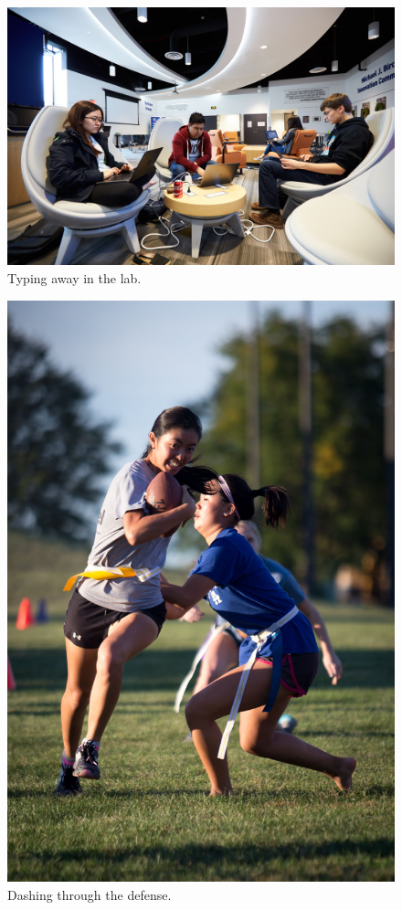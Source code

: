 \documentclass{report}
\begin{document}
\begin{figure}
  \includegraphics[width=\linewidth]{res/promo_in2.jpg}
  \caption{Typing away in the lab.}
\end{figure}

\begin{figure}
  \includegraphics[width=\linewidth]{res/sport_grace.jpg}
  \caption{Dashing through the defense.}
\end{figure}
\end{document}
